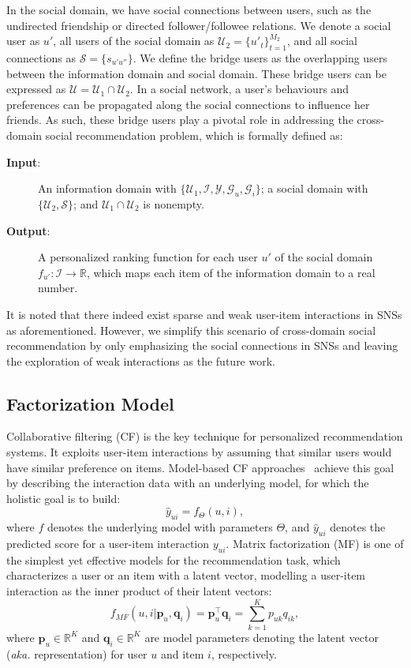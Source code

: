\documentclass[sigconf]{acmart}
\newcommand{\Trans}[1]{{#1}^{\top}}
\newcommand{\Mat}[1]{\mathbf{#1}}
\newcommand{\Set}[1]{\mathcal{#1}}
\newcommand{\aka}{\emph{aka. }}
\begin{document}
In the social domain, we have social connections between users, such as the undirected friendship or directed follower/followee relations.
We denote a social user as $u'$, all users of the social domain as $\Set{U}_{2}=\{u'_{t}\}_{t=1}^{M_{2}}$, and all social connections as $\Set{S}=\{s_{u' u''}\}$.
We define the bridge users as the overlapping users between the information domain and social domain. These bridge users can be expressed as $\Set{U}=\Set{U}_{1}\cap\Set{U}_{2}$.
In a social network, a user's behaviours and preferences can be propagated along the social connections to influence her friends. As such, these bridge users play a pivotal role in addressing the cross-domain social recommendation problem, which is formally defined as:
\begin{description}
	\item[\textbf{Input}:] An information domain with $\{\Set{U}_1, \Set{I}, \Set{Y}, \Set{G}_{u}, \Set{G}_{i}\}$; a social domain with $\{\Set{U}_2, \Set{S}\}$; and $\Set{U}_1\cap \Set{U}_2$ is nonempty.
	\item[\textbf{Output}:] A personalized ranking function for each user $u'$ of the social domain $f_{u'} : \Set{I} \to \mathbb{R}$, which maps each item of the information domain to a real number.
\end{description}
It is noted that there indeed exist sparse and weak user-item interactions in SNSs as aforementioned. However, we simplify this scenario of cross-domain social recommendation by only emphasizing the social connections in SNSs and leaving the exploration of weak interactions as the future work.






\subsection{Factorization Model}
Collaborative filtering (CF) is the key technique for personalized recommendation systems. It exploits user-item interactions by assuming that similar users would have similar preference on items.
Model-based CF approaches~\cite{iCD,DCF} achieve this goal by describing the interaction data with an underlying model, for which the holistic goal is to build:
\begin{equation}\label{equ:predicted-rating}
\widehat{y}_{ui}=f_{\Theta}(u,i),
\end{equation}
where $f$ denotes the underlying model with parameters $\Theta$, and $\widehat{y}_{ui}$ denotes the predicted score for a user-item interaction $y_{ui}$.
Matrix factorization (MF) is one of the simplest yet effective models for the recommendation task, which characterizes a user or an item with a latent vector, modelling a user-item interaction as the inner product of their latent vectors:
\begin{equation}
\label{equ:mf}
f_{MF}(u,i|\Mat{p}_{u},\Mat{q}_{i})=\Trans{\Mat{p}}_{u}\Mat{q}_{i}=\sum_{k=1}^{K}p_{uk}q_{ik},
\end{equation}
where $\textbf{p}_u\in\mathbb{R}^K$ and $\textbf{q}_i\in\mathbb{R}^K$ are model parameters denoting the latent vector (\aka representation) for user $u$ and item $i$, respectively.
\end{document}
